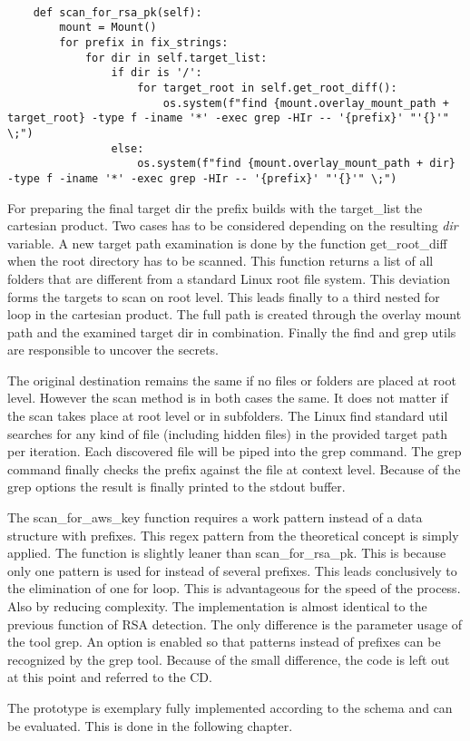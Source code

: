 \lstset{language=Python}          
\begin{lstlisting}[]  % Start your code-block
		
    def scan_for_rsa_pk(self):
        mount = Mount()
        for prefix in fix_strings:
            for dir in self.target_list:
                if dir is '/':
                    for target_root in self.get_root_diff():
                        os.system(f"find {mount.overlay_mount_path + target_root} -type f -iname '*' -exec grep -HIr -- '{prefix}' "'{}'" \;")
                else:
                    os.system(f"find {mount.overlay_mount_path + dir} -type f -iname '*' -exec grep -HIr -- '{prefix}' "'{}'" \;")
\end{lstlisting}
For preparing the final target dir the prefix builds with the target\_list the cartesian product. 
Two cases has to be considered depending on the resulting \textit{dir} variable. 
A new target path examination is done by the function get\_root\_diff when the root directory has to be scanned. 
This function returns a list of all folders that are different from a standard Linux root file system. 
This deviation forms the targets to scan on root level. This leads finally to a third nested for loop in the cartesian product. 
The full path is created through the overlay mount path and the examined target dir in combination. 
Finally the find and grep utils are responsible to uncover the secrets.

The original destination remains the same if no files or folders are placed at root level.
However the scan method is in both cases the same. It does not matter if the scan takes place at root level or in subfolders.
The Linux find standard util searches for any kind of file (including hidden files) in the provided target path per iteration.
Each discovered file will be piped into the grep command. The grep command finally checks the prefix against the file at context level. 
Because of the grep options the result is finally printed to the stdout buffer.

The scan\_for\_aws\_key function requires a work pattern instead of a data structure with prefixes. 
This regex pattern from the theoretical concept is simply applied.
The function is slightly leaner than scan\_for\_rsa\_pk. 
This is because only one pattern is used for instead of several prefixes. 
This leads conclusively to the elimination of one for loop.
This is advantageous for the speed of the process. Also by reducing complexity. 
The implementation is almost identical to the previous function of RSA detection. 
The only difference is the parameter usage of the tool grep. 
An option is enabled so that patterns instead of prefixes can be recognized by the grep tool.
Because of the small difference, the code is left out at this point and referred to the CD.

The prototype is exemplary fully implemented according to the schema and can be evaluated. This is done in the following chapter.